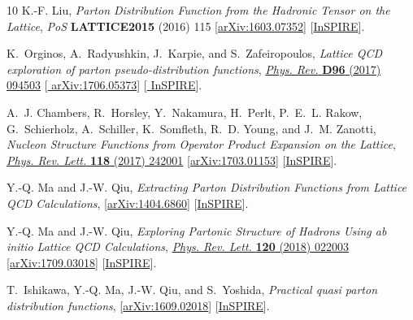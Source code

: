 \begin{thebibliography}{10}
K.-F. Liu, {\it {Parton Distribution Function from the Hadronic Tensor on the
  Lattice}},
{\em PoS} {\bfseries LATTICE2015} (2016) 115
  [\href{http://arxiv.org/abs/1603.07352}{{\ttfamily arXiv:1603.07352}}]
  [\href{http://inspirehep.net/record/1434313}{{\ttfamily InSPIRE}}].

K.~Orginos, A.~Radyushkin, J.~Karpie, and S.~Zafeiropoulos, {\it {Lattice QCD
  exploration of parton pseudo-distribution functions}},
\href{http://dx.doi.org/10.1103/PhysRevD.96.094503}{{\em Phys. Rev.} {\bfseries
  D96} (2017) 094503} [\href{http://arxiv.org/abs/1706.05373}{{\ttfamily
  arXiv:1706.05373}}] [\href{http://inspirehep.net/record/1605575}{{\ttfamily
  InSPIRE}}].

A.~J. Chambers, R.~Horsley, Y.~Nakamura, H.~Perlt, P.~E.~L. Rakow,
  G.~Schierholz, A.~Schiller, K.~Somfleth, R.~D. Young, and J.~M. Zanotti, {\it
  {Nucleon Structure Functions from Operator Product Expansion on the
  Lattice}},
\href{http://dx.doi.org/10.1103/PhysRevLett.118.242001}{{\em Phys. Rev. Lett.}
  {\bfseries 118} (2017) 242001}
  [\href{http://arxiv.org/abs/1703.01153}{{\ttfamily arXiv:1703.01153}}]
  [\href{http://inspirehep.net/record/1516003}{{\ttfamily InSPIRE}}].

Y.-Q. Ma and J.-W. Qiu,
{\it {Extracting Parton Distribution Functions from Lattice QCD Calculations}},
   [\href{http://arxiv.org/abs/1404.6860}{{\ttfamily arXiv:1404.6860}}]
  [\href{http://inspirehep.net/record/1292807}{{\ttfamily InSPIRE}}].

Y.-Q. Ma and J.-W. Qiu, {\it {Exploring Partonic Structure of Hadrons Using ab
  initio Lattice QCD Calculations}},
\href{http://dx.doi.org/10.1103/PhysRevLett.120.022003}{{\em Phys. Rev. Lett.}
  {\bfseries 120} (2018) 022003}
  [\href{http://arxiv.org/abs/1709.03018}{{\ttfamily arXiv:1709.03018}}]
  [\href{http://inspirehep.net/record/1622746}{{\ttfamily InSPIRE}}].

T.~Ishikawa, Y.-Q. Ma, J.-W. Qiu, and S.~Yoshida,
{\it {Practical quasi parton distribution functions}},
  [\href{http://arxiv.org/abs/1609.02018}{{\ttfamily arXiv:1609.02018}}]
  [\href{http://inspirehep.net/record/1485578}{{\ttfamily InSPIRE}}].


\end{thebibliography}
